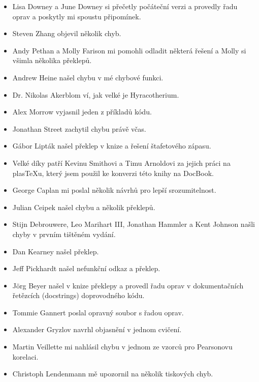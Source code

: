 \documentclass[12pt]{book}
\begin{document}
\begin{itemize}

\item Lisa Downey a June Downey si přečetly počáteční verzi a provedly řadu oprav a poskytly mi spoustu připomínek.

\item Steven Zhang objevil několik chyb.

\item Andy Pethan a Molly Farison mi pomohli odladit některá řešení a Molly si všimla několika překlepů.

\item Andrew Heine našel chybu v mé chybové funkci.

\item Dr. Nikolas Akerblom ví, jak velké je Hyracotherium.

\item Alex Morrow vyjasnil jeden z příkladů kódu.

\item Jonathan Street zachytil chybu právě včas.

\item G\'{a}bor Lipt\'{a}k našel překlep v knize a řešení štafetového zápasu.

\item Velké díky patří Kevinu Smithovi a Timu Arnoldovi za jejich práci na plasTeXu, který jsem použil ke konverzi této knihy na DocBook.

\item George Caplan mi poslal několik návrhů pro lepší srozumitelnost.

\item Julian Ceipek našel chybu a několik překlepů.

\item Stijn Debrouwere, Leo Marihart III, Jonathan Hammler a Kent Johnson
našli chyby v prvním tištěném vydání.

\item Dan Kearney našel překlep.

\item Jeff Pickhardt našel nefunkční odkaz a překlep.

\item J\"{o}rg Beyer našel v knize překlepy a provedl řadu oprav v dokumentačních řetězcích (docstrings) doprovodného kódu.

\item Tommie Gannert poslal opravný soubor s řadou oprav.

\item Alexander Gryzlov navrhl objasnění v jednom cvičení.

\item Martin Veillette mi nahlásil chybu v jednom ze vzorců pro Pearsonovu korelaci.

\item Christoph Lendenmann mě upozornil na několik tiskových chyb.


\end{itemize}
\end{document}
